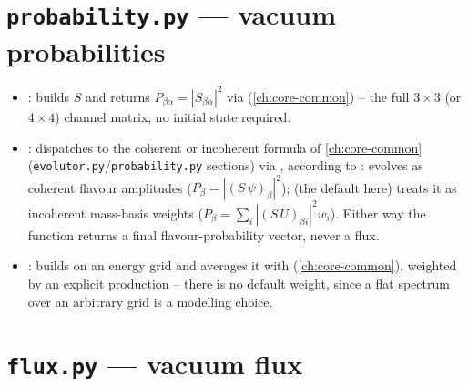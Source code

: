 \section{\texttt{probability.py} --- vacuum probabilities}

{\sloppy{}}

\begin{implbox}
\begin{itemize}
  \item {}:
    builds $S$ and returns $P_{\beta\alpha}=|S_{\beta\alpha}|^2$ via
    (\cref{ch:core-common}) -- the full $3\times3$ (or $4\times4$) channel
    matrix, no initial state required.
  \item {}:
    dispatches to the coherent or incoherent formula of
    \cref{ch:core-common} (\texttt{evolutor.py}/\texttt{probability.py}
    sections) via , according to
    :  evolves  as coherent
    flavour amplitudes ($P_\beta=|(S\,\psi)_\beta|^2$);  (the
    default here) treats it as incoherent mass-basis weights
    ($P_\beta=\sum_i|(S\,U)_{\beta i}|^2w_i$). Either way the function
    returns a final flavour-probability vector, never a flux.
  \item {}:
    builds  on an energy grid and averages
    it with 
    (\cref{ch:core-common}), weighted by an explicit production
     -- there is no default weight, since a flat spectrum
    over an arbitrary grid is a modelling choice.
\end{itemize}
\end{implbox}

\section{\texttt{flux.py} --- vacuum flux}

